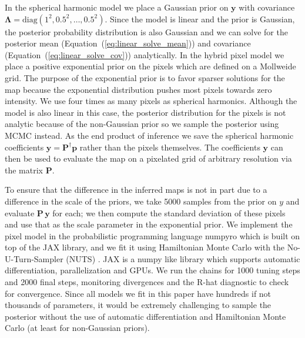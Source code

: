 \documentclass[modern]{aastex62}
\begin{document}
In the spherical harmonic model we place a Gaussian prior on $\mathbf{y}$ with covariance $\boldsymbol{\Lambda}=\mathrm{diag}(1^2,0.5^2,\dots,0.5^2)$.
Since the model is linear and the prior is Gaussian, the posterior probability distribution is also Gaussian and we can solve for the posterior mean (Equation~(\ref{eq:linear_solve_mean})) and covariance (Equation~(\ref{eq:linear_solve_cov})) analytically.
In the hybrid pixel model we place a positive exponential prior on the pixels which are defined on a Mollweide grid. 
The purpose of the exponential prior is to favor sparser solutions for the map because the exponential distribution pushes most pixels towards zero intensity.
We use four times as many pixels as spherical harmonics.
Although the model is also linear in this case, the posterior distribution for the pixels is not analytic because of the non-Gaussian prior so we sample the posterior using MCMC instead.
As the end product of inference we save the spherical harmonic coefficients $\mathbf{y}=\mathbf{P}^\dagger\mathbf{p}$ rather than the pixels themselves.
The coefficients $\mathbf{y}$ can then be used to evaluate the map on a pixelated grid of arbitrary resolution via the matrix $\mathbf{P}$. 

To ensure that the difference in the inferred maps is not in part due to a difference in the scale of the priors, we take 5000 samples from the prior on $y$ and evaluate $\mathbf{P}\,\mathbf{y}$ for each; we then compute the standard deviation of these pixels and use that as the scale parameter in the exponential prior.
We implement the pixel model in the probabilistic programming language \textsf{numpyro} \citep{phan2019a} which is built on top of the \textsf{JAX} \citep{jax2018github} library, and we fit it using Hamiltonian Monte Carlo with the No-U-Turn-Sampler (NUTS) \citep{hoffman2014}.
\textsf{JAX} is a \textsf{numpy} like library which supports automatic differentiation, parallelization and GPUs.
We run the chains for 1000 tuning steps and 2000 final steps, monitoring divergences \citep{betancourt2013} and the R-hat  diagnostic  \citep{gelman1992a} to check for convergence.
Since all models we fit in this paper have hundreds if not thousands of parameters, it would be extremely challenging to sample the posterior  without the use of automatic differentiation and Hamiltonian Monte Carlo (at least for non-Gaussian priors).
\end{document}
